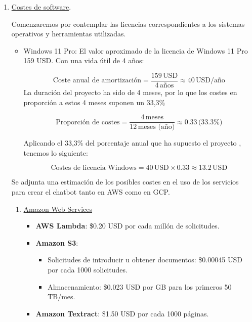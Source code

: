 \begin{enumerate}
	\item \underline{Costes de software}.

		Comenzaremos por contemplar las licencias correspondientes a los sistemas
		operativos y herramientas utilizadas.

		\begin{itemize}
			\item {Windows 11 Pro}: El valor aproximado de la licencia de Windows 11
				Pro 159 USD. Con una vida útil de 4 años:

				\[
					\text{{Coste anual de amortización}}= \frac{{159 \,\text{{USD}}}}{4 \,\text{{años}}}
					\approx 40 \,\text{{USD/año}}
				\]
				La duración del proyecto ha sido de 4 meses, por lo que los costes en
				proporción a estos 4 meses suponen un 33,3\%

				\[
					\text{{Proporción de costes}}= \frac{4 \,\text{{meses}}}{12 \,\text{{meses (año)}}}
					\approx 0.33 \, \text{(33.3\%)}
				\]

				Aplicando el 33,3\% del porcentaje anual que ha supuesto el proyecto ,
				tenemos lo siguiente:

				\[
					\text{{Costes de licencia Windows}}= 40 \,\text{{USD}}\times 0.33 \approx
					13.2 \,\text{{USD}}
				\]
		\end{itemize}

		Se adjunta una estimación de los posibles costes en el uso de los servicios para
		crear el chatbot tanto en AWS como en GCP.

		\begin{enumerate}
			\item \underline{Amazon Web Services}

				\begin{itemize}
					\item \textbf{AWS Lambda}: \$0.20 USD por cada millón de solicitudes.

					\item \textbf{Amazon S3}:
						\begin{itemize}
							\item Solicitudes de introducir u obtener documentos: \$0.00045 USD
								por cada 1000 solicitudes.

							\item Almacenamiento: \$0.023 USD por GB para los primeros 50 TB/mes.
						\end{itemize}

					\item \textbf{Amazon Textract}: \$1.50 USD por cada 1000 páginas.


\end{itemize}
\end{enumerate}
\end{enumerate}
